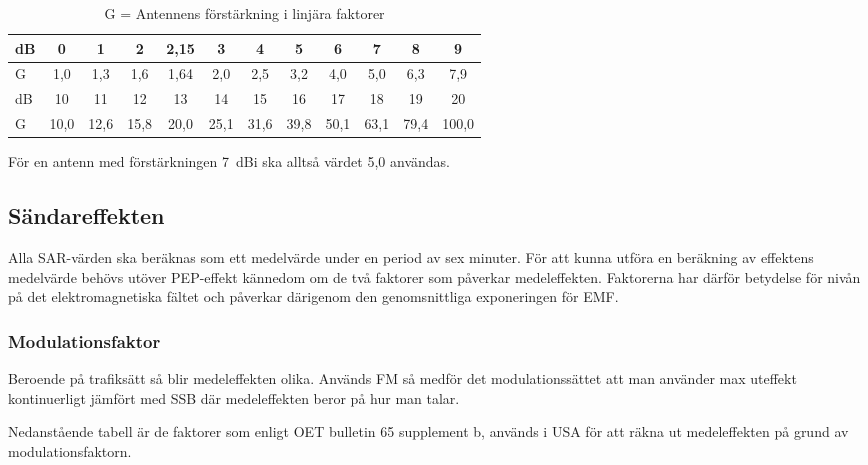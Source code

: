 \begin{table*}[h]
  \begin{center}
    \begin{tabular}{|l|ccccccccccc|}
	\hline
	dB     &  0  &  1  &  2 & 2,15 &  3  &  4  &  5  &  6  &  7  &  8  &  9  \\ \hline
	G & 1,0 & 1,3 & 1,6 & 1,64 & 2,0 & 2,5 & 3,2 & 4,0 & 5,0 & 6,3 & 7,9 \\ \hline
	dB     &  10  &  11  &  12  &  13  &  14  &  15  &  16  &  17  &  18  &  19  &  20 \\ \hline
	G & 10,0 & 12,6 & 15,8 & 20,0 & 25,1 & 31,6 & 39,8 & 50,1 & 63,1 & 79,4 & 100,0 \\ \hline
    \end{tabular}
    \caption{G = Antennens förstärkning i linjära faktorer}
    \label{tab:forst}
  \end{center}
\end{table*}

För en antenn med förstärkningen 7~dBi ska alltså värdet 5,0 användas.


\subsection{Sändareffekten}
Alla SAR-värden ska beräknas som ett medelvärde under en period av sex minuter.
För att kunna utföra en beräkning av effektens medelvärde behövs utöver
PEP-effekt kännedom om de två faktorer som påverkar medeleffekten.
Faktorerna har därför betydelse för nivån på det elektromagnetiska fältet och
påverkar därigenom den genomsnittliga exponeringen för EMF.

\subsubsection{Modulationsfaktor}

Beroende på trafiksätt så blir medeleffekten olika.
Används FM så medför det modulationssättet att man använder max uteffekt
kontinuerligt jämfört med SSB där medeleffekten beror på hur man talar.

Nedanstående tabell är de faktorer som enligt OET bulletin 65 supplement b,
\cite{OETbul65b} används i USA för att räkna ut medeleffekten på grund
av modulationsfaktorn.

